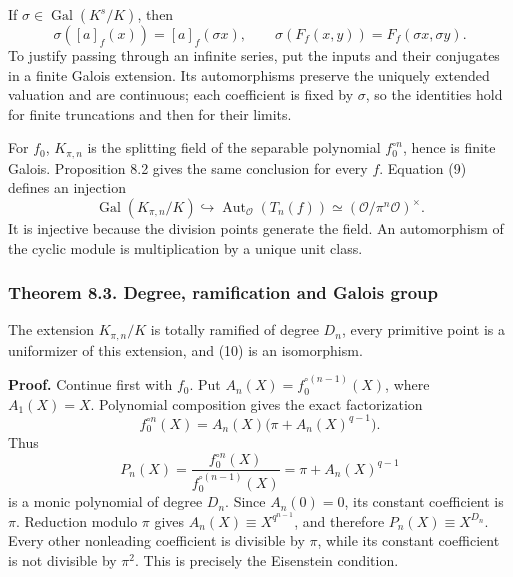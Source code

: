 \documentclass[11pt,a4paper]{article}
\begin{document}
If \(\sigma\in\operatorname{Gal}(K^s/K)\), then \[
\sigma([a]_f(x))=[a]_f(\sigma x),\qquad
\sigma(F_f(x,y))=F_f(\sigma x,\sigma y).
\tag{9}
\] To justify passing through an infinite series, put the inputs and
their conjugates in a finite Galois extension. Its automorphisms
preserve the uniquely extended valuation and are continuous; each
coefficient is fixed by \(\sigma\), so the identities hold for finite
truncations and then for their limits.

For \(f_0\), \(K_{\pi,n}\) is the splitting field of the separable
polynomial \(f_0^{\circ n}\), hence is finite Galois. Proposition 8.2
gives the same conclusion for every \(f\). Equation (9) defines an
injection \[
\operatorname{Gal}(K_{\pi,n}/K)
 \hookrightarrow\operatorname{Aut}_{\mathcal O}(T_n(f))
 \simeq(\mathcal O/\pi^n\mathcal O)^\times.
\tag{10}
\] It is injective because the division points generate the field. An
automorphism of the cyclic module is multiplication by a unique unit
class.

\subsubsection{Theorem 8.3. Degree, ramification and Galois
group}\label{theorem-8.3.-degree-ramification-and-galois-group}

The extension \(K_{\pi,n}/K\) is totally ramified of degree \(D_n\),
every primitive point is a uniformizer of this extension, and (10) is an
isomorphism.

\textbf{Proof.} Continue first with \(f_0\). Put
\(A_n(X)=f_0^{\circ(n-1)}(X)\), where \(A_1(X)=X\). Polynomial
composition gives the exact factorization \[
f_0^{\circ n}(X)=A_n(X)\bigl(\pi+A_n(X)^{q-1}\bigr).
\] Thus \[
P_n(X)=\frac{f_0^{\circ n}(X)}{f_0^{\circ(n-1)}(X)}
       =\pi+A_n(X)^{q-1}
\tag{11}
\] is a monic polynomial of degree \(D_n\). Since \(A_n(0)=0\), its
constant coefficient is \(\pi\). Reduction modulo \(\pi\) gives
\(A_n(X)\equiv X^{q^{n-1}}\), and therefore \(P_n(X)\equiv X^{D_n}\).
Every other nonleading coefficient is divisible by \(\pi\), while its
constant coefficient is not divisible by \(\pi^2\). This is precisely
the Eisenstein condition.
\end{document}
